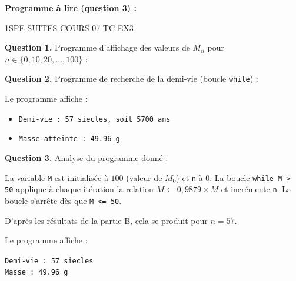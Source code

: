\noindent\textbf{Programme à lire (question 3) :}



\begin{corrige}{1SPE-SUITES-COURS-07-TC-EX3}

\textbf{Question 1.} Programme d'affichage des valeurs de $M_n$ pour $n \in \{0, 10, 20, \ldots, 100\}$ :




\textbf{Question 2.} Programme de recherche de la demi-vie (boucle \texttt{while}) :



Le programme affiche :
\begin{itemize}
  \item \texttt{Demi-vie : 57 siecles, soit 5700 ans}
  \item \texttt{Masse atteinte : 49.96 g}
\end{itemize}

\textbf{Question 3.} Analyse du programme donné :

La variable \texttt{M} est initialisée à $100$ (valeur de $M_0$) et \texttt{n} à $0$. La boucle \texttt{while M > 50} applique à chaque itération la relation $M \leftarrow 0{,}9879 \times M$ et incrémente \texttt{n}. La boucle s'arrête dès que \texttt{M <= 50}.

D'après les résultats de la partie B, cela se produit pour $n = 57$.

Le programme affiche :

\begin{center}
\texttt{Demi-vie : 57 siecles}\\
\texttt{Masse : 49.96 g}
\end{center}

\end{corrige}

\bigskip


